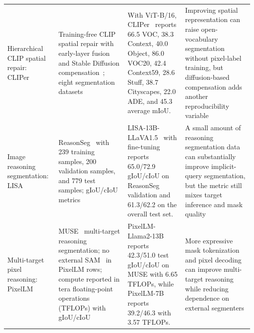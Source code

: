 \begin{table}[t]
\begin{tabularx}{\textwidth}{>{\raggedright\arraybackslash}p{}>{\raggedright\arraybackslash}p{}>{\raggedright\arraybackslash}p{}>{\raggedright\arraybackslash}X}
Hierarchical CLIP spatial repair: CLIPer~\citep{lsunCliperHierarchicallyImproving2025} & Training-free CLIP~\citep{radford2021learning} spatial repair with early-layer fusion and Stable Diffusion compensation~\citep{rombach2022high}; eight segmentation datasets & With ViT-B/16, CLIPer~\citep{lsunCliperHierarchicallyImproving2025} reports 66.5 VOC, 38.3 Context, 40.0 Object, 86.0 VOC20, 42.4 Context59, 28.6 Stuff, 38.7 Cityscapes, 22.0 ADE, and 45.3 average mIoU. & Improving spatial representation can raise open-vocabulary segmentation without pixel-label training, but diffusion-based compensation adds another reproducibility variable \\
Image reasoning segmentation: LISA~\citep{xlaiLisaReasoningSegmentation2024} & ReasonSeg~\citep{xlaiLisaReasoningSegmentation2024} with 239 training samples, 200 validation samples, and 779 test samples; gIoU/cIoU metrics & LISA-13B-LLaVA1.5~\citep{xlaiLisaReasoningSegmentation2024} with fine-tuning reports 65.0/72.9 gIoU/cIoU on ReasonSeg validation and 61.3/62.2 on the overall test set. & A small amount of reasoning segmentation data can substantially improve implicit-query segmentation, but the metric still mixes target inference and mask quality \\
Multi-target pixel reasoning: PixelLM~\citep{renPixellmPixelReasoning2024} & MUSE~\citep{renPixellmPixelReasoning2024} multi-target reasoning segmentation; no external SAM~\citep{kirillov2023sam} in PixelLM rows; compute reported in tera floating-point operations (TFLOPs) with gIoU/cIoU & PixelLM-Llama2-13B~\citep{renPixellmPixelReasoning2024} reports 42.3/51.0 test gIoU/cIoU on MUSE with 6.65 TFLOPs, while PixelLM-7B reports 39.2/46.3 with 3.57 TFLOPs. & More expressive mask tokenization and pixel decoding can improve multi-target reasoning while reducing dependence on external segmenters \\
\bottomrule
\end{tabularx}
\end{table}

